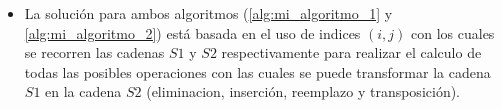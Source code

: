 \begin{itemize}
    \item La solución para ambos algoritmos (\cref{alg:mi_algoritmo_1} y \cref{alg:mi_algoritmo_2}) está basada en el uso de indices $(i,j)$
    con los cuales se recorren las cadenas $S1$ y $S2$ respectivamente para realizar el calculo de todas las posibles operaciones con las 
    cuales se puede transformar la cadena $S1$ en la cadena $S2$ (eliminacion, inserción, reemplazo y transposición).
\end{itemize}

